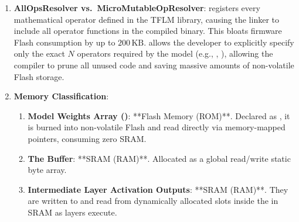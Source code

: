\begin{enumerate}
    \item \textbf{AllOpsResolver vs.\ MicroMutableOpResolver}:
     registers every mathematical operator defined in the TFLM library, causing the linker to include all operator functions in the compiled binary. This bloats firmware Flash consumption by up to $200\,\text{KB}$.  allows the developer to explicitly specify only the exact $N$ operators required by the model (e.g., , ), allowing the compiler to prune all unused code and saving massive amounts of non-volatile Flash storage.

    \item \textbf{Memory Classification}:
    \begin{enumerate}
        \item \textbf{Model Weights Array ()}: **Flash Memory (ROM)**. Declared as , it is burned into non-volatile Flash and read directly via memory-mapped pointers, consuming zero SRAM.
        \item \textbf{The  Buffer}: **SRAM (RAM)**. Allocated as a global read/write static byte array.
        \item \textbf{Intermediate Layer Activation Outputs}: **SRAM (RAM)**. They are written to and read from dynamically allocated slots inside the  in SRAM as layers execute.
    \end{enumerate}
\end{enumerate}
